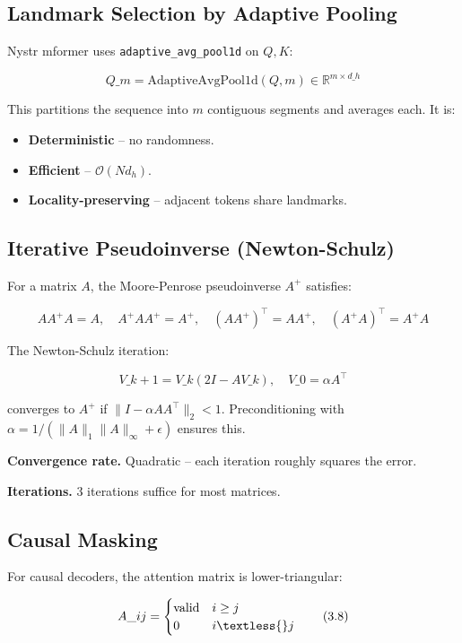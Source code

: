 \subsection{Landmark Selection by Adaptive Pooling}

Nystr mformer uses \texttt{adaptive\_avg\_pool1d} on $Q, K$:

\[
Q\_m = \mathrm{AdaptiveAvgPool1d}(Q, m) \in \mathbb{R}^{m \times d\_h}
\tag{3.5}
\]

This partitions the sequence into $m$ contiguous segments and averages 
each. It is:

\begin{itemize}
\item \textbf{Deterministic} -- no randomness.
\item \textbf{Efficient} -- $\mathcal{O}(N d_h)$.
\item \textbf{Locality-preserving} -- adjacent tokens share landmarks.

\end{itemize}
\subsection{Iterative Pseudoinverse (Newton-Schulz)}

For a matrix $A$, the Moore-Penrose pseudoinverse $A^+$ satisfies:

\[
A A^+ A = A, \quad A^+ A A^+ = A^+, \quad (A A^+)^\top = A A^+, \quad (A^+ A)^\top = A^+ A
\tag{3.6}
\]

The Newton-Schulz iteration:

\[
V\_{k+1} = V\_k (2 I - A V\_k), \quad V\_0 = \alpha A^\top
\tag{3.7}
\]

converges to $A^+$ if $\|I - \alpha A A^\top\|_2 < 1$. Preconditioning 
with $\alpha = 1 / (\|A\|_1 \|A\|_\infty + \epsilon)$ ensures this.

\textbf{Convergence rate.} Quadratic -- each iteration roughly squares the error.

\textbf{Iterations.} 3 iterations suffice for most matrices.

\subsection{Causal Masking}

For causal decoders, the attention matrix is lower-triangular:

\[
A\_{ij} = \begin{cases} \text{valid} & i \geq j \\ 0 & i \textless{} j \end{cases}
\tag{3.8}
\]

